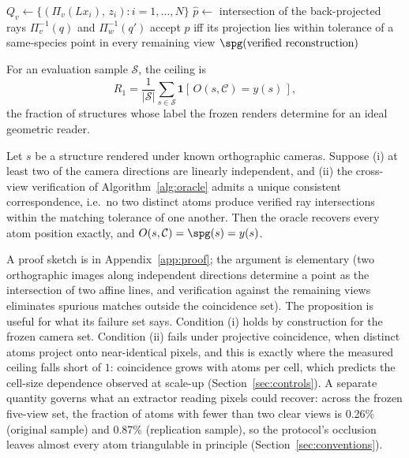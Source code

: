 \begin{algorithm}[t]
\caption{Geometric oracle $O(s, \mathcal{C})$}
\label{alg:oracle}
\begin{algorithmic}[1]
  \State $Q_v \gets \{(\Pi_v(L x_i),\, z_i) : i = 1,\dots,N\}$
\EndFor
{}
  \State $\hat{p} \gets$ intersection of the back-projected rays $\Pi_v^{-1}(q)$ and $\Pi_w^{-1}(q')$
  \State accept $\hat{p}$ iff its projection lies within tolerance of a same-species point in every
         remaining view
\EndFor
\State \Return $\spg(\text{verified reconstruction})$
\end{algorithmic}
\end{algorithm}

\begin{definition}
\label{def:ceiling}
For an evaluation sample $\mathcal{S}$, the ceiling is
\[
R_1 = \frac{1}{|\mathcal{S}|}\sum_{s \in \mathcal{S}} \mathbf{1}\!\left[\,O(s,\mathcal{C}) = y(s)\,\right],
\]
the fraction of structures whose label the frozen renders determine for an ideal geometric reader.
\end{definition}

\begin{proposition}
\label{prop:ident}
Let $s$ be a structure rendered under known orthographic cameras. Suppose (i) at least two of the camera
directions are linearly independent, and (ii) the cross-view verification of
Algorithm~\ref{alg:oracle} admits a unique consistent correspondence, i.e.\ no two distinct atoms produce
verified ray intersections within the matching tolerance of one another. Then the oracle recovers every
atom position exactly, and $O(s, \mathcal{C}) = \spg(s) = y(s)$.
\end{proposition}

A proof sketch is in Appendix~\ref{app:proof}; the argument is elementary (two orthographic images along
independent directions determine a point as the intersection of two affine lines, and verification against
the remaining views eliminates spurious matches outside the coincidence set). The proposition is useful for
what its failure set says. Condition (i) holds by construction for the frozen camera set. Condition
(ii) fails under projective coincidence, when distinct atoms project onto near-identical pixels, and this
is exactly where the measured ceiling falls short of $1$: coincidence grows with atoms per cell, which
predicts the cell-size dependence observed at scale-up (Section~\ref{sec:controls}). A separate quantity
governs what an extractor reading pixels could recover: across the frozen five-view set, the fraction of
atoms with fewer than two clear views is 0.26\% (original sample) and 0.87\% (replication sample), so the
protocol's occlusion leaves almost every atom triangulable in principle (Section~\ref{sec:conventions}).


